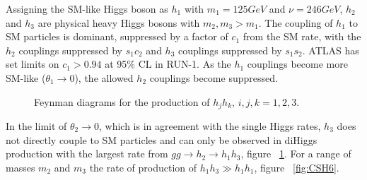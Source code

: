 Assigning the SM-like Higgs boson as ${h_{1}}$ with ${m_{1} = 125 GeV}$  and ${\nu = 246 GeV}$,  ${h_{2}}$ and ${h_{3}}$ are physical heavy Higgs bosons with ${m_{2}, m_{3} > m_{1}}$. The coupling of ${h_{1}}$ to SM particles is dominant, suppressed by a factor of ${c_{1}}$ from the SM rate, with the ${h_{2}}$ couplings suppressed by ${s_{1}c_{2}}$ and ${h_{3}}$ couplings suppressed by ${s_{1}s_{2}}$. ATLAS has set limits on ${c_{1} > 0.94}$ at 95\% CL in RUN-1. As the ${h_{1}}$ couplings become more SM-like (${\theta_{1}\rightarrow{0}}$), the allowed ${h_{2}}$ couplings become suppressed.\newline

\begin{figure}[h]
\begin{center}
\hspace{1cm}
\caption{Feynman diagrams for the production of ${h_{j}h_{k}}$, ${i, j, k = 1, 2, 3}$.}
\label{fig:FeyComp}
\end{center}
\end{figure}


\indent In the limit of ${\theta_{2}\rightarrow{0}}$, which is in agreement with the single Higgs rates, ${h_{3}}$ does not directly couple to SM particles and can only be observed in diHiggs production with the largest rate from ${gg\rightarrow h_{2}\rightarrow h_{1}h_{3}}$, figure ~\ref{fig:FeyComp}. For a range of masses ${m_{2}}$ and ${m_{3}}$ the rate of production of ${h_{1}h_{3} \gg h_{1}h_{1}}$, figure ~\ref{fig:CSH6}. \newline

